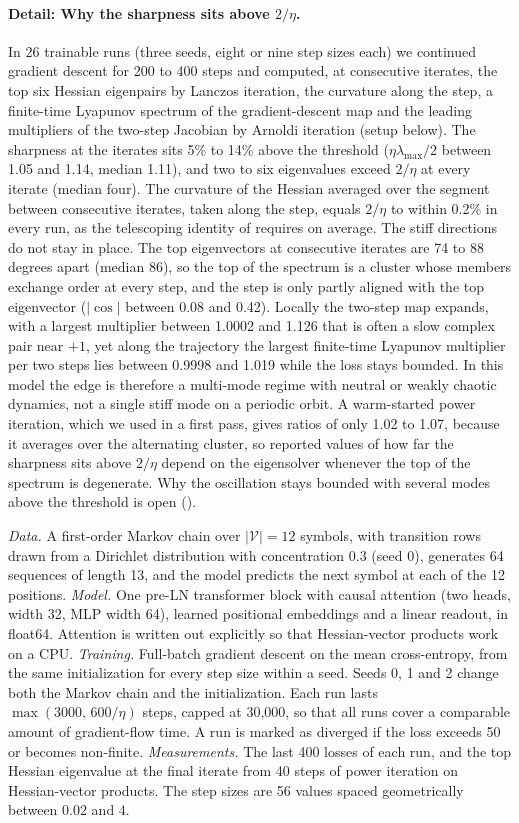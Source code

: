 \paragraph{Detail: Why the sharpness sits above $2/\eta$.} In 26 trainable runs (three seeds, eight or nine step sizes each) we continued gradient descent for 200 to 400 steps and computed, at consecutive iterates, the top six Hessian eigenpairs by Lanczos iteration, the curvature along the step, a finite-time Lyapunov spectrum of the gradient-descent map and the leading multipliers of the two-step Jacobian by Arnoldi iteration (setup below). The sharpness at the iterates sits 5\% to 14\% above the threshold ($\eta\lambda_{\max}/2$ between 1.05 and 1.14, median 1.11), and two to six eigenvalues exceed $2/\eta$ at every iterate (median four). The curvature of the Hessian averaged over the segment between consecutive iterates, taken along the step, equals $2/\eta$ to within 0.2\% in every run, as the telescoping identity of \citet{litman2026origin} requires on average. The stiff directions do not stay in place. The top eigenvectors at consecutive iterates are 74 to 88 degrees apart (median 86), so the top of the spectrum is a cluster whose members exchange order at every step, and the step is only partly aligned with the top eigenvector ($|\cos|$ between 0.08 and 0.42). Locally the two-step map expands, with a largest multiplier between 1.0002 and 1.126 that is often a slow complex pair near $+1$, yet along the trajectory the largest finite-time Lyapunov multiplier per two steps lies between 0.9998 and 1.019 while the loss stays bounded. In this model the edge is therefore a multi-mode regime with neutral or weakly chaotic dynamics, not a single stiff mode on a periodic orbit. A warm-started power iteration, which we used in a first pass, gives ratios of only 1.02 to 1.07, because it averages over the alternating cluster, so reported values of how far the sharpness sits above $2/\eta$ depend on the eigensolver whenever the top of the spectrum is degenerate. Why the oscillation stays bounded with several modes above the threshold is open ().

\emph{Data.} A first-order Markov chain over $|\mathcal V|=12$ symbols, with transition rows drawn from a Dirichlet distribution with concentration $0.3$ (seed 0), generates 64 sequences of length 13, and the model predicts the next symbol at each of the 12 positions. \emph{Model.} One pre-LN transformer block with causal attention (two heads, width 32, MLP width 64), learned positional embeddings and a linear readout, in float64. Attention is written out explicitly so that Hessian-vector products work on a CPU. \emph{Training.} Full-batch gradient descent on the mean cross-entropy, from the same initialization for every step size within a seed. Seeds 0, 1 and 2 change both the Markov chain and the initialization. Each run lasts $\max(3000,\,600/\eta)$ steps, capped at 30{,}000, so that all runs cover a comparable amount of gradient-flow time. A run is marked as diverged if the loss exceeds 50 or becomes non-finite. \emph{Measurements.} The last 400 losses of each run, and the top Hessian eigenvalue at the final iterate from 40 steps of power iteration on Hessian-vector products. The step sizes are 56 values spaced geometrically between $0.02$ and $4$.

